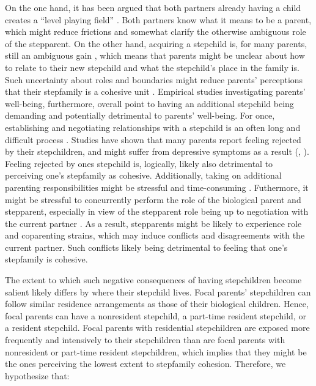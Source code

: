 \documentclass[\pandocDocMode,longtable,floatsintext]{apa6}
\begin{document}
On the one hand, it has been argued that both partners already having a
child creates a ``level playing field'' \autocite{fine1996clarity}. Both
partners know what it means to be a parent, which might reduce frictions
and somewhat clarify the otherwise ambiguous role of the stepparent. On
the other hand, acquiring a stepchild is, for many parents, still an
ambiguous gain \autocite{jensen2021theorizing}, which means that parents
might be unclear about how to relate to their new stepchild and what the
stepchild's place in the family is. Such uncertainty about roles and
boundaries might reduce parents' perceptions that their stepfamily is a
cohesive unit \autocite{downs2004family}. Empirical studies
investigating parents' well-being, furthermore, overall point to having
an additional stepchild being demanding and potentially detrimental to
parents' well-being. For once, establishing and negotiating
relationships with a stepchild is an often long and difficult process
\autocite{ganong1999stepparents}. Studies have shown that many parents
report feeling rejected by their stepchildren, and might suffer from
depressive symptoms as a result (\autocite{ganong2011patterns},
\autocite{shapiro2011parenting}). Feeling rejected by ones stepchild is,
logically, likely also detrimental to perceiving one's stepfamily as
cohesive. Additionally, taking on additional parenting responsibilities
might be stressful and time-consuming \autocite{guzzo2019variation}.
Futhermore, it might be stressful to concurrently perform the role of
the biological parent and stepparent, especially in view of the
stepparent role being up to negotiation with the current partner
\autocite{nomaguchi2020parenthood}. As a result, stepparents might be
likely to experience role and coparenting strains, which may induce
conflicts and disagreements with the current partner. Such conflicts
likely being detrimental to feeling that one's stepfamily is cohesive.

The extent to which such negative consequences of having stepchildren
become salient likely differs by where their stepchild lives. Focal
parents' stepchildren can follow similar residence arrangements as those
of their biological children. Hence, focal parents can have a
nonresident stepchild, a part-time resident stepchild, or a resident
stepchild. Focal parents with residential stepchildren are exposed more
frequently and intensively to their stepchildren than are focal parents
with nonresident or part-time resident stepchildren, which implies that
they might be the ones perceiving the lowest extent to stepfamily
cohesion. Therefore, we hypothesize that:
\end{document}
